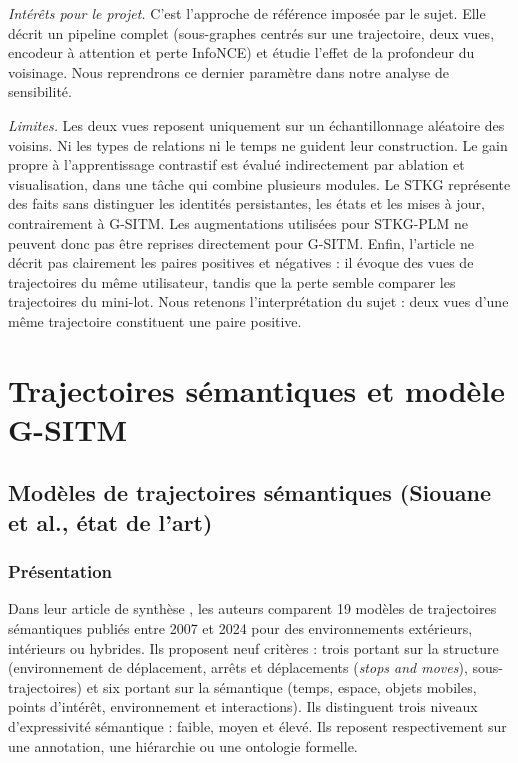 \documentclass[11pt, french, screen, research-development]{report-rd-info}
\begin{document}
\emph{Intérêts pour le projet.}
 C'est l'approche de référence imposée par le sujet. Elle décrit un pipeline complet (sous-graphes
centrés sur une trajectoire, deux vues, encodeur à attention et perte InfoNCE) et étudie l'effet de
la profondeur du voisinage. Nous reprendrons ce dernier paramètre dans notre analyse de sensibilité.

\emph{Limites.}
 Les deux vues reposent uniquement sur un échantillonnage aléatoire des voisins. Ni les types de
relations ni le temps ne guident leur construction. Le gain propre à l'apprentissage contrastif est
évalué indirectement par ablation et visualisation, dans une tâche qui combine plusieurs modules. Le
STKG représente des faits sans distinguer les identités persistantes, les états et les mises à jour,
contrairement à G-SITM. Les augmentations utilisées pour STKG-PLM ne peuvent donc pas être reprises
directement pour G-SITM. Enfin, l'article ne décrit pas clairement les paires positives et négatives
: il évoque des vues de trajectoires du même utilisateur, tandis que la perte semble comparer les
trajectoires du mini-lot. Nous retenons l'interprétation du sujet : deux vues d'une même trajectoire
constituent une paire positive.

\section{Trajectoires sémantiques et modèle G-SITM}

\subsection{Modèles de trajectoires sémantiques (Siouane et al., état de l'art)}

\subsubsection*{Présentation}

 Dans leur article de synthèse \cite{siouane2026survey}, les auteurs comparent 19 modèles de
trajectoires sémantiques publiés entre 2007 et 2024 pour des environnements extérieurs, intérieurs
ou hybrides. Ils proposent neuf critères : trois portant sur la structure (environnement de
déplacement, arrêts et déplacements (\emph{stops and moves}), sous-trajectoires) et six portant sur
la sémantique (temps, espace, objets mobiles, points d'intérêt, environnement et interactions). Ils
distinguent trois niveaux d'expressivité sémantique : faible, moyen et élevé. Ils reposent
respectivement sur une annotation, une hiérarchie ou une ontologie formelle.
\end{document}

